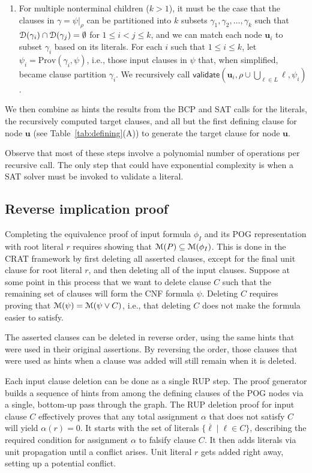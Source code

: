 \documentclass[letterpaper,USenglish,cleveref, autoref, thm-restate]{lipics-v2021}
\newcommand{\obar}[1]{\overline{#1}}
\newcommand{\lit}{\ell}
\newcommand{\dependencyset}{{\cal D}}
\newcommand{\assign}{\alpha}
\newcommand{\passign}{\rho}
\newcommand{\modelset}{{\cal M}}
\newcommand{\validate}{\textsf{validate}}
\newcommand{\prov}{\textrm{Prov}}
\newcommand{\inputformula}{\phi_I}
\newcommand{\makenode}[1]{\mathbf{#1}}
\newcommand{\nodeu}{\makenode{u}}
\newcommand{\simplify}[2]{#1|_{#2}}
\begin{document}
\begin{enumerate}
\begin{enumerate}
\item For multiple nonterminal children ($k > 1$),
  it must be the case that the clauses in
  $\gamma = \simplify{\psi}{\passign}$ can be partitioned into $k$ subsets
  $\gamma_1, \gamma_2, \ldots, \gamma_k$ such that $\dependencyset(\gamma_i)
  \cap \dependencyset(\gamma_j) = \emptyset$ for $1 \leq i < j \leq k$,
  and we can match each node $\nodeu_i$ to subset $\gamma_i$ based on its
  literals.
  For each $i$ such that $1 \leq i \leq k$, let $\psi_i = \prov(\gamma_i, \psi)$, i.e., those input clauses in $\psi$ that, when simplified, became clause partition $\gamma_i$.
  We recursively call
  $\validate \left(\nodeu_i, \passign \cup \bigcup_{\lit \in L} \lit, \psi_i\right)$.
\end{enumerate}
  We then combine as hints the results from the BCP and SAT calls for
  the literals, the recursively computed target clauses, and all but
  the first defining clause for node $\nodeu$
(see Table~\ref{tab:defining}(A))
to generate the target clause for node $\nodeu$.
\end{enumerate}
Observe that most of these steps involve a polynomial number of
operations per recursive call.  The only step that could have
exponential complexity is when a SAT solver must be invoked to validate a
literal.

\subsection{Reverse implication proof}

Completing the equivalence proof of input formula $\inputformula$ and its POG
representation with root literal $r$ requires showing that
$\modelset(P) \subseteq \modelset(\inputformula)$.  This is done in the
CRAT framework by first deleting all asserted clauses, except for the
final unit clause for root literal $r$, and then deleting all of the
input clauses.  Suppose at some point in this process that we want to
delete clause $C$ such that the remaining set of clauses will form the
CNF formula $\psi$.  Deleting $C$ requires proving that
$\modelset(\psi) = \modelset(\psi \lor C)$, i.e., that deleting $C$
does not make the formula easier to satisfy.

The asserted clauses can be deleted in reverse order, using the same
hints that were used in their original assertions.  By reversing the
order, those clauses that were used as hints when a clause was
added will still remain when it is deleted.

Each input clause deletion can be done as a single RUP step.  The
proof generator builds a sequence of hints from among the defining
clauses of the POG nodes via a single, bottom-up pass through the
graph.  The RUP deletion proof for input clause $C$ effectively proves that any
total assignment $\assign$ that does not satisfy $C$ will yield
$\assign(r) = 0$.  It starts with the set of literals
$\{ \obar{\lit} \mid \lit \in C\}$, describing the required condition for
assignment $\assign$ to falsify clause $C$.
It then
adds literals via unit propagation until a
conflict arises.    Unit literal $r$ gets
added right away, setting up a potential conflict.
\end{document}
